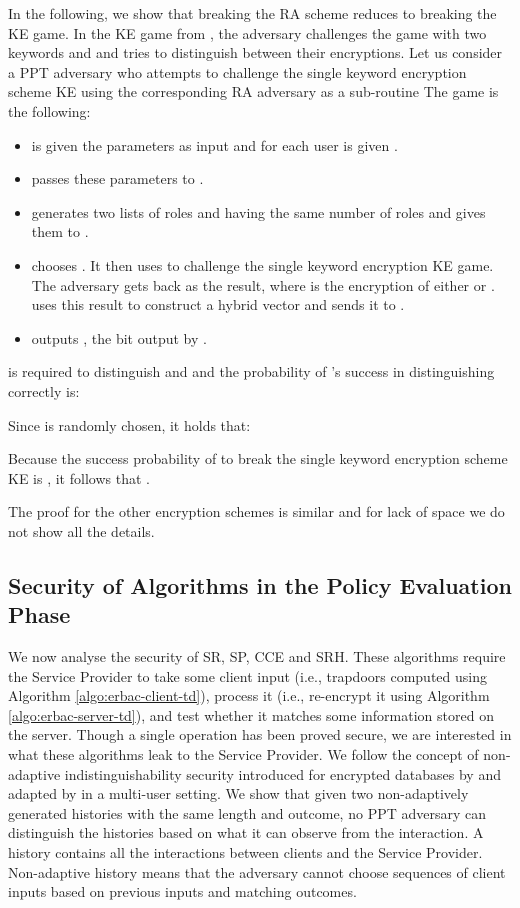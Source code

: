 \documentclass[epsfig,a4paper,11pt,titlepage]{book}
\numberwithin{algorithm}{chapter}
\begin{document}
In the following, we show that breaking the \gls{RA} scheme reduces to breaking the \gls{KE} game. In the \gls{KE} game from \cite{Dong:2011}, the adversary challenges the game with two keywords  and  and tries to distinguish between their encryptions. Let us consider a \gls{PPT} adversary  who attempts to challenge the single keyword encryption scheme \gls{KE} using the corresponding \gls{RA} adversary  as a sub-routine The game is the following:
\begin{itemize}
\item  is given the parameters  as input and for each user  is given .
\item  passes these parameters to .
\item  generates two lists of roles  and  having the same number of roles   and gives them to .
\item  chooses . It then uses  to challenge the single keyword encryption \gls{KE} game. The adversary gets back  as the result, where  is the encryption of either  or .  uses this result to construct a hybrid vector  and sends it to .
\item  outputs , the bit output by .
\end{itemize}

 is required to distinguish  and  and the probability of 's success in distinguishing correctly is:


Since  is randomly chosen, it holds that:
\noindent


Because the success probability of  to break the single keyword encryption scheme \gls{KE} is , it follows that .

The proof for the other encryption schemes is similar and for lack of space we do not show all the details.

\subsection{Security of Algorithms in the Policy Evaluation Phase}
We now analyse the security of \gls{SR}, \gls{SP}, \gls{CCE} and \gls{SRH}. These algorithms require the Service Provider to take some client input (i.e., trapdoors computed using Algorithm \ref{algo:erbac-client-td}), process it (i.e., re-encrypt it using Algorithm \ref{algo:erbac-server-td}), and test whether it matches some information stored on the server. Though a single operation has been proved secure, we are interested in what these algorithms leak to the Service Provider. We follow the concept of non-adaptive indistinguishability security introduced for encrypted databases by \cite{Curtmola:2006} and adapted by \cite{Dong:2011} in a multi-user setting. We show that given two non-adaptively generated histories with the same length and outcome, no \gls{PPT} adversary can distinguish the histories based on what it can observe from the interaction. A history contains all the interactions between clients and the Service Provider. Non-adaptive history means that the adversary cannot choose sequences of client inputs based on previous inputs and matching outcomes.
\end{document}
